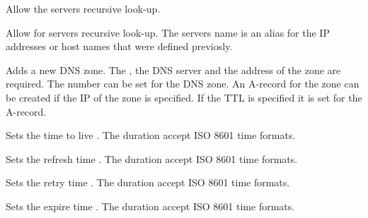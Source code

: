 Allow the servers recursive look-up.


Allow for servers  recursive look-up. The servers name is an alias
for the IP addresses or host names that were defined previosly.


Adds a new DNS zone. The , the  DNS server and 
the  address of the zone are required. The  number can
be set for the DNS zone.
An A-record for the zone
can be created if the IP  of the zone is specified. If the
TTL  is specified it is set for the A-record.


Sets the time to live . 
The duration accept ISO 8601 time formats.


Sets the refresh time .
The duration accept ISO 8601 time formats.


Sets the retry time .
The duration accept ISO 8601 time formats.


Sets the expire time .
The duration accept ISO 8601 time formats.


